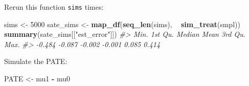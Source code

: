 \documentclass[]{book}
\newenvironment{Shaded}{\begin{snugshade}}{\end{snugshade}}
\newcommand{\CommentTok}[1]{\textcolor[rgb]{0.56,0.35,0.01}{\textit{#1}}}
\newcommand{\DecValTok}[1]{\textcolor[rgb]{0.00,0.00,0.81}{#1}}
\newcommand{\KeywordTok}[1]{\textcolor[rgb]{0.13,0.29,0.53}{\textbf{#1}}}
\newcommand{\NormalTok}[1]{#1}
\newcommand{\OperatorTok}[1]{\textcolor[rgb]{0.81,0.36,0.00}{\textbf{#1}}}
\newcommand{\StringTok}[1]{\textcolor[rgb]{0.31,0.60,0.02}{#1}}
\theoremstyle{definition}
\theoremstyle{definition}
\theoremstyle{definition}
\theoremstyle{remark}
\begin{document}
Rerun this function \texttt{sims} times:

\begin{Shaded}
\begin{Highlighting}[]
\NormalTok{sims <-}\StringTok{ }\DecValTok{5000}
\NormalTok{sate_sims <-}\StringTok{ }\KeywordTok{map_df}\NormalTok{(}\KeywordTok{seq_len}\NormalTok{(sims), }\OperatorTok{~}\StringTok{ }\KeywordTok{sim_treat}\NormalTok{(smpl))}
\KeywordTok{summary}\NormalTok{(sate_sims[[}\StringTok{"est_error"}\NormalTok{]])}
\CommentTok{#>    Min. 1st Qu.  Median    Mean 3rd Qu.    Max. }
\CommentTok{#>  -0.484  -0.087  -0.002  -0.001   0.085   0.414}
\end{Highlighting}
\end{Shaded}

Simulate the PATE:

\begin{Shaded}
\begin{Highlighting}[]
\NormalTok{PATE <-}\StringTok{ }\NormalTok{mu1 }\OperatorTok{-}\StringTok{ }\NormalTok{mu0}
\end{Highlighting}
\end{Shaded}
\end{document}

